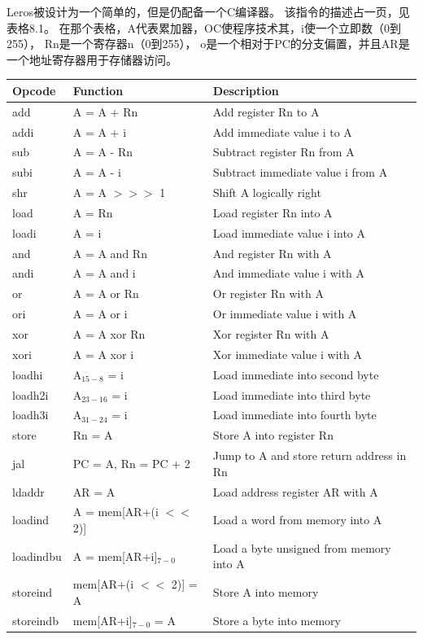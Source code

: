 \documentclass[%
    10pt,
    headinclude, footexclude,
    openright, %
    notitlepage,
    cleardoubleempty,
    headsepline,
    pointlessnumbers,
    bibtotoc, idxtotoc,
    ]{scrbook}
\begin{document}
Leros被设计为一个简单的，但是仍配备一个C编译器。
该指令的描述占一页，见表格8.1。
在那个表格，A代表累加器，OC使程序技术其，i使一个立即数（0到255）， Rn是一个寄存器n（0到255），
o是一个相对于PC的分支偏置，并且AR是一个地址寄存器用于存储器访问。


\begin{table}
\centering
\begin{tabular}{lll}
\toprule
Opcode & Function & Description\\
\midrule
add & A = A + Rn & Add register Rn to A \\
addi & A = A + i & Add immediate value i to A \\
sub & A = A - Rn & Subtract register Rn from A \\
subi & A = A - i & Subtract immediate value i from A \\
shr & A = A $>>>$ 1 & Shift A logically right \\
load & A = Rn & Load register Rn into A \\
loadi & A = i & Load immediate value i into A \\
and & A = A and Rn & And register Rn with A \\
andi & A = A and i & And immediate value i with A \\
or & A = A or Rn & Or register Rn with A \\
ori & A = A or i & Or immediate value i with A \\
xor & A = A xor Rn & Xor register Rn with A \\
xori & A = A xor i & Xor immediate value i with A \\
loadhi & A$_{15-8}$ = i & Load immediate into second byte \\
loadh2i & A$_{23-16}$ = i  & Load immediate into third byte \\
loadh3i & A$_{31-24}$ = i & Load immediate into fourth byte \\
store & Rn = A & Store A into register Rn \\
jal & PC = A, Rn = PC + 2 & Jump to A and store return address in Rn \\
ldaddr & AR = A & Load address register AR with A \\
loadind & A = mem[AR+(i $<<$ 2)] & Load a word from memory into A \\
loadindbu & A = mem[AR+i]$_{7-0}$  &  Load a byte unsigned from memory into A\\
storeind & mem[AR+(i $<<$ 2)] = A & Store A into memory \\
storeindb & mem[AR+i]$_{7-0}$ = A & Store a byte into memory \\

\end{tabular}
\end{table}
\end{document}
